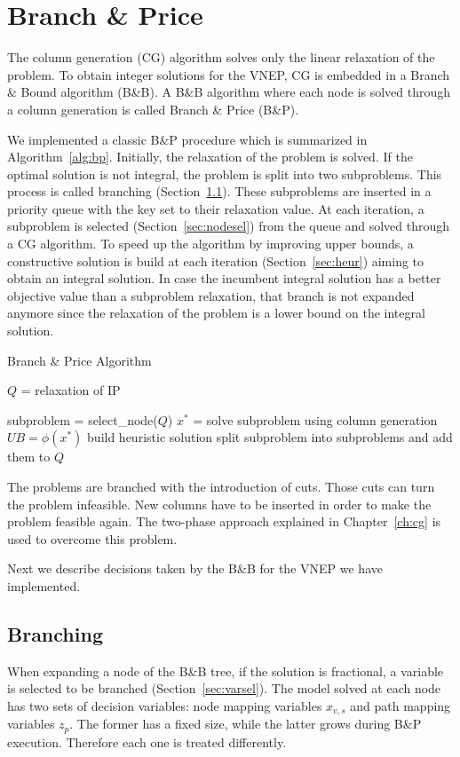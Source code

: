 \chapter{Branch \& Price}
\label{ch:bp}

The column generation (CG) algorithm solves only the linear relaxation of the problem.
To obtain integer solutions for the VNEP, CG is embedded in a Branch \& Bound algorithm (B\&B).
A B\&B algorithm where each node is solved through a column generation is called Branch \& Price (B\&P).

We implemented a classic B\&P procedure which is summarized in Algorithm~\ref{alg:bp}.
Initially, the relaxation of the problem is solved.
If the optimal solution is not integral, the problem is split into two subproblems.
This process is called branching (Section~\ref{sec:branching}).
These subproblems are inserted in a priority queue with the key set to their relaxation value.
At each iteration, a subproblem is selected (Section~\ref{sec:nodesel}) from the queue and solved through a CG algorithm.
To speed up the algorithm by improving upper bounds, a constructive solution is build at each iteration (Section~\ref{sec:heur}) aiming to obtain an integral solution.
In case the incumbent integral solution has a better objective value than a subproblem relaxation, that branch is not expanded anymore since the relaxation of the problem is a lower bound on the integral solution.

\begin{algorithm}[t]
\caption{Branch \& Price Algorithm}
$Q$ = {relaxation of IP}

  {
    subproblem = select\_node($Q$)\; \label{alg:genbp:snode}
    $x^*$ = solve subproblem using column generation\;
    {
      {$UB = \phi(x^*)$\;}
      {build heuristic solution\;
      split subproblem into subproblems and add them to $Q$\;\label{alg:bp:split}}
    }
  }
\label{alg:bp}
\end{algorithm}

The problems are branched with the introduction of cuts. Those cuts can turn the problem infeasible. 
New columns have to be inserted in order to make the problem feasible again.
The two-phase approach explained in Chapter~\ref{ch:cg} is used to overcome this problem.

Next we describe decisions taken by the B\&B for the VNEP we have implemented.

\section{Branching}
\label{sec:branching}
When expanding a node of the B\&B tree, if the solution is fractional, a variable is selected to be branched (Section~\ref{sec:varsel}).
The model solved at each node has two sets of decision variables: node mapping variables $x_{v,s}$ and path mapping variables $z_{p}$.
The former has a fixed size, while the latter grows during B\&P execution.
Therefore each one is treated differently. 

